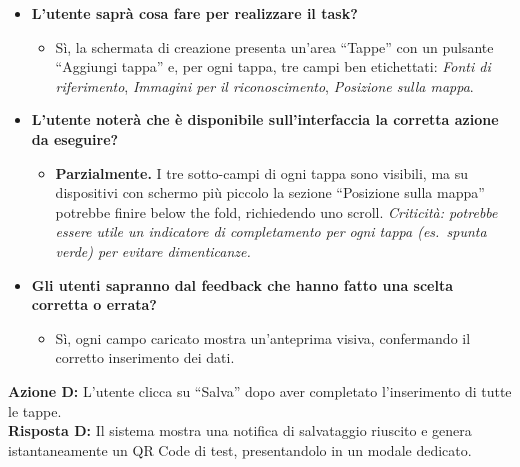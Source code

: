 \begin{itemize}[nosep, leftmargin=1.6em]
    \item \textbf{L'utente saprà cosa fare per realizzare il task?}
    \begin{itemize}[nosep, leftmargin=1.6em]
        \item Sì, la schermata di creazione presenta un'area ``Tappe'' con un pulsante ``Aggiungi tappa'' e, per ogni tappa, tre campi ben etichettati: \textit{Fonti di riferimento}, \textit{Immagini per il riconoscimento}, \textit{Posizione sulla mappa}.
    \end{itemize}
    \item \textbf{L'utente noterà che è disponibile sull'interfaccia la corretta azione da eseguire?}
    \begin{itemize}[nosep, leftmargin=1.6em]
        \item \textbf{Parzialmente.} I tre sotto-campi di ogni tappa sono visibili, ma su dispositivi con schermo più piccolo la sezione ``Posizione sulla mappa'' potrebbe finire below the fold, richiedendo uno scroll. \textit{Criticità: potrebbe essere utile un indicatore di completamento per ogni tappa (es.\ spunta verde) per evitare dimenticanze.}
    \end{itemize}
    \item \textbf{Gli utenti sapranno dal feedback che hanno fatto una scelta corretta o errata?}
    \begin{itemize}[nosep, leftmargin=1.6em]
        \item Sì, ogni campo caricato mostra un'anteprima visiva, confermando il corretto inserimento dei dati.
    \end{itemize}
\end{itemize}

\vspace{0.3cm}
\noindent\textbf{Azione D:} L'utente clicca su ``Salva'' dopo aver completato l'inserimento di tutte le tappe.\\
\textbf{Risposta D:} Il sistema mostra una notifica di salvataggio riuscito e genera istantaneamente un QR Code di test, presentandolo in un modale dedicato.

